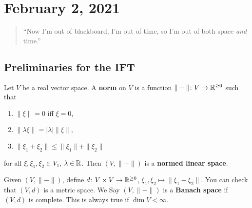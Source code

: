 \section{February 2, 2021}
\begin{quotation}
    ``Now I'm out of blackboard, I'm out of time, so I'm out of both space \emph{and} time.''
\end{quotation}
\subsection{Preliminaries for the IFT}
\begin{definition}[]
    Let $V$ be a real vector space. A \textbf{norm} on $V$ is a function $\|-\|\colon V \to \mathbb{R}^{\geq 0}$ such that 
    \begin{enumerate}[label=(\roman*)]
        \item $\|\xi\|=0$ iff $\xi=0$,
        \item $\|\lambda \xi\|=|\lambda| \|\xi\|$,
        \item $\|\xi_1+\xi_2\|\leq \|\xi_1\|+\|\xi_2\|$
    \end{enumerate}
    for all $\xi,\xi_1,\xi_2\in V_1$, $\lambda \in \mathbb{R}$. Then $(V, \|-\|)$ is a \textbf{normed linear space}.
\end{definition}
Given $(V,\|-\|)$, define $d \colon V\times V \to \mathbb{R}^{\geq 0}$, $\xi_1,\xi_2 \mapsto \|\xi_1-\xi_2\|$. You can check that $(V,d)$ is a metric space. We Say $(V, \|-\|)$ is a \textbf{Banach space} if $(V,d)$ is complete. This is always true if $\operatorname{dim}V<\infty$.

